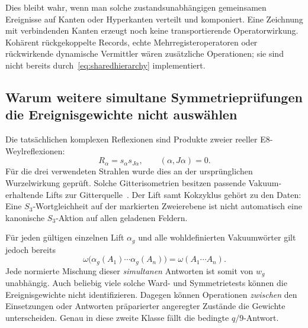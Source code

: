 Dies bleibt wahr, wenn man solche zustandsunabhängigen gemeinsamen Ereignisse auf Kanten oder Hyperkanten verteilt und komponiert. Eine Zeichnung mit verbindenden Kanten erzeugt noch keine transportierende Operatorwirkung. Kohärent rückgekoppelte Records, echte Mehrregisteroperatoren oder rückwirkende dynamische Vermittler wären zusätzliche Operationen; sie sind nicht bereits durch~\eqref{eq:sharedhierarchy} implementiert.

\subsection{Warum weitere simultane Symmetrieprüfungen die Ereignisgewichte nicht auswählen}
Die tatsächlichen komplexen Reflexionen sind Produkte zweier reeller E8-Weylreflexionen:
\begin{equation}
R_\alpha=s_\alpha s_{J\alpha},\qquad (\alpha,J\alpha)=0.
\end{equation}
Für die drei verwendeten Strahlen wurde dies an der ursprünglichen Wurzelwirkung geprüft. Solche Gitterisometrien besitzen passende Vakuum-erhaltende Lifts zur Gitterquelle~\cite{dongnagjoint}. Der Lift samt Kokzyklus gehört zu den Daten: Eine $S_3$-Wortgleichheit auf der markierten Zweierebene ist nicht automatisch eine kanonische $S_3$-Aktion auf allen geladenen Feldern.

Für jeden gültigen einzelnen Lift $\alpha_g$ und alle wohldefinierten Vakuumwörter gilt jedoch bereits
\begin{equation}\label{eq:vacuumweightblind}
\omega\bigl(\alpha_g(A_1)\cdots\alpha_g(A_n)\bigr)
=\omega(A_1\cdots A_n).
\end{equation}
Jede normierte Mischung dieser \emph{simultanen} Antworten ist somit von $w_g$ unabhängig. Auch beliebig viele solche Ward- und Symmetrietests können die Ereignisgewichte nicht identifizieren. Dagegen können Operationen \emph{zwischen} den Einsetzungen oder Antworten präparierter angeregter Zustände die Gewichte unterscheiden. Genau in diese zweite Klasse fällt die bedingte $q/9$-Antwort.


